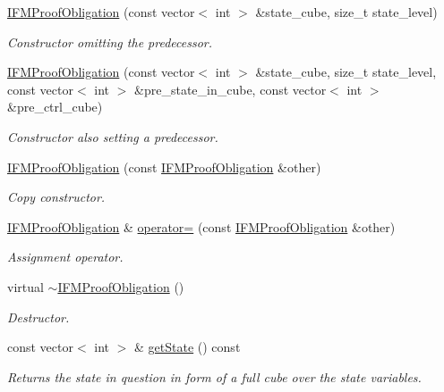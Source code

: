 \begin{DoxyCompactItemize}
\item 
\hyperlink{classIFMProofObligation_a5c774e39decb6399858b22192ce91ccb}{I\-F\-M\-Proof\-Obligation} (const vector$<$ int $>$ \&state\-\_\-cube, size\-\_\-t state\-\_\-level)
\begin{DoxyCompactList}\small\item\em Constructor omitting the predecessor. \end{DoxyCompactList}\item 
\hyperlink{classIFMProofObligation_ae1a80b72265ebee8fe33461119bf2ab1}{I\-F\-M\-Proof\-Obligation} (const vector$<$ int $>$ \&state\-\_\-cube, size\-\_\-t state\-\_\-level, const vector$<$ int $>$ \&pre\-\_\-state\-\_\-in\-\_\-cube, const vector$<$ int $>$ \&pre\-\_\-ctrl\-\_\-cube)
\begin{DoxyCompactList}\small\item\em Constructor also setting a predecessor. \end{DoxyCompactList}\item 
\hyperlink{classIFMProofObligation_a4f7d62a51ba4dfa4398b415034a320c6}{I\-F\-M\-Proof\-Obligation} (const \hyperlink{classIFMProofObligation}{I\-F\-M\-Proof\-Obligation} \&other)
\begin{DoxyCompactList}\small\item\em Copy constructor. \end{DoxyCompactList}\item 
\hyperlink{classIFMProofObligation}{I\-F\-M\-Proof\-Obligation} \& \hyperlink{classIFMProofObligation_ab314748b1ee6226ca48ef7a69bedff6e}{operator=} (const \hyperlink{classIFMProofObligation}{I\-F\-M\-Proof\-Obligation} \&other)
\begin{DoxyCompactList}\small\item\em Assignment operator. \end{DoxyCompactList}\item 
virtual \hyperlink{classIFMProofObligation_afcb88686953a327b0340fbf51cae2f1c}{$\sim$\-I\-F\-M\-Proof\-Obligation} ()
\begin{DoxyCompactList}\small\item\em Destructor. \end{DoxyCompactList}\item 
const vector$<$ int $>$ \& \hyperlink{classIFMProofObligation_a75083a8658b5dbc8b7d824081876170e}{get\-State} () const 
\begin{DoxyCompactList}\small\item\em Returns the state in question in form of a full cube over the state variables. \end{DoxyCompactList}\item 

\end{DoxyCompactItemize}
